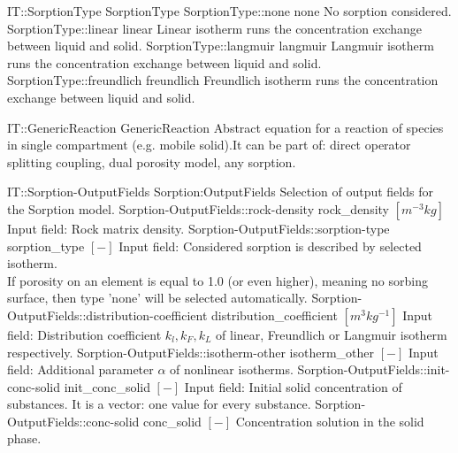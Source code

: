\begin{SelectionType}
	{IT::SorptionType}
	{SorptionType}
	{}
		\SelectionItem
			{SorptionType::none}
			{none}
			{{{No sorption considered.}%
}}
		\SelectionItem
			{SorptionType::linear}
			{linear}
			{{{Linear isotherm runs the concentration exchange between liquid and solid.}%
}}
		\SelectionItem
			{SorptionType::langmuir}
			{langmuir}
			{{{Langmuir isotherm runs the concentration exchange between liquid and solid.}%
}}
		\SelectionItem
			{SorptionType::freundlich}
			{freundlich}
			{{{Freundlich isotherm runs the concentration exchange between liquid and solid.}%
}}
\end{SelectionType}
\begin{AbstractType}
	{IT::GenericReaction}
	{GenericReaction}
	{}
	{{{Abstract equation for a reaction of species in single compartment (e.g. mobile solid).It can be part of: direct operator splitting coupling, dual porosity model, any sorption.}%
}}
\end{AbstractType}
\begin{SelectionType}
	{IT::Sorption-OutputFields}
	{Sorption:OutputFields}
	{{{Selection of output fields for the Sorption model.}%
}}
		\SelectionItem
			{Sorption-OutputFields::rock-density}
			{rock{\_}density}
			{{{}{$[m^{-3}kg]$}{ Input field: Rock matrix density.}%
}}
		\SelectionItem
			{Sorption-OutputFields::sorption-type}
			{sorption{\_}type}
			{{{}{$[-]$}{ Input field: Considered sorption is described by selected isotherm.}\\{
If porosity on an element is equal to 1.0 (or even higher), meaning no sorbing surface, then type 'none' will be selected automatically.}%
}}
		\SelectionItem
			{Sorption-OutputFields::distribution-coefficient}
			{distribution{\_}coefficient}
			{{{}{$[m^{3}kg^{-1}]$}{ Input field: Distribution coefficient }{ $k_l, k_F, k_L $}{ of linear, Freundlich or Langmuir isotherm respectively.}%
}}
		\SelectionItem
			{Sorption-OutputFields::isotherm-other}
			{isotherm{\_}other}
			{{{}{$[-]$}{ Input field: Additional parameter }{$ \alpha $}{ of nonlinear isotherms.}%
}}
		\SelectionItem
			{Sorption-OutputFields::init-conc-solid}
			{init{\_}conc{\_}solid}
			{{{}{$[-]$}{ Input field: Initial solid concentration of substances.
It is a vector: one value for every substance.}%
}}
		\SelectionItem
			{Sorption-OutputFields::conc-solid}
			{conc{\_}solid}
			{{{}{$[-]$}{ Concentration solution in the solid phase.}%
}}
\end{SelectionType}
